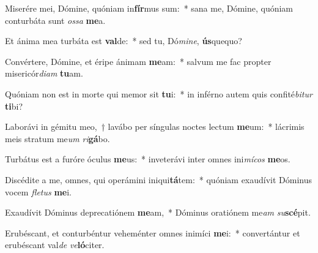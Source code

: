 \item Miserére mei, Dómine, quóniam in\textbf{fír}mus sum:~* sana me, Dómine, quóniam conturbáta sunt \textit{os}\textit{sa} \textbf{me}a.
\item Et ánima mea turbáta est \textbf{val}de:~* sed tu, Dó\textit{mi}\textit{ne}, \textbf{ús}quequo?
\item Convértere, Dómine, et éripe ánimam \textbf{me}am:~* salvum me fac propter misericór\textit{di}\textit{am} \textbf{tu}am.
\item Quóniam non est in morte qui memor sit \textbf{tu}i:~* in inférno autem quis confité\textit{bi}\textit{tur} \textbf{ti}bi?
\item Laborávi in gémitu meo,~† lavábo per síngulas noctes lectum \textbf{me}um:~* lácrimis meis stratum me\textit{um} \textit{ri}\textbf{gá}bo.
\item Turbátus est a furóre óculus \textbf{me}us:~* inveterávi inter omnes ini\textit{mí}\textit{cos} \textbf{me}os.
\item Discédite a me, omnes, qui operámini iniqui\textbf{tá}tem:~* quóniam exaudívit Dóminus vocem \textit{fle}\textit{tus} \textbf{me}i.
\item Exaudívit Dóminus deprecatiónem \textbf{me}am,~* Dóminus oratiónem me\textit{am} \textit{su}\textbf{scé}pit.
\item Erubéscant, et conturbéntur veheménter omnes inimíci \textbf{me}i:~* convertántur et erubéscant val\textit{de} \textit{ve}\textbf{ló}citer.
